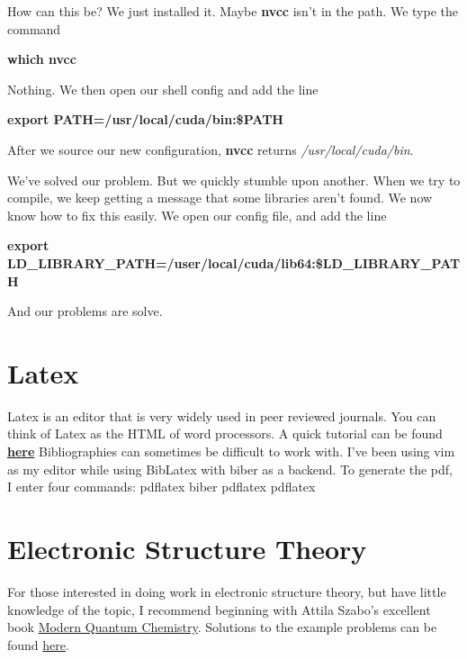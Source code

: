 \documentclass{article}
\begin{document}
\hfill

How can this be?
We just installed it.
Maybe \textbf{nvcc} isn't in the path.
We type the command  \smallskip \\

\centerline{\textbf{which nvcc}} \smallskip

\hfill

Nothing.
We then open our shell config and add the line \smallskip \\

\centerline{\textbf{export PATH=/usr/local/cuda/bin:\$PATH}} \smallskip

\hfill

After we source our new configuration, \textbf{nvcc} returns \textit{/usr/local/cuda/bin}.

\hfill

We've solved our problem.
But we quickly stumble upon another.
When we try to compile, we keep getting a message that some libraries aren't found.
We now know how to fix this easily. We open our config file, and add the line \smallskip \\

\centerline{\textbf{export LD\_LIBRARY\_PATH=/user/local/cuda/lib64:\$LD\_LIBRARY\_PATH}}

\hfill

And our problems are solve.

\section*{Latex}

Latex is an editor that is very widely used in peer reviewed journals.
You can think of Latex as the HTML of word processors.
A quick tutorial can be found \href{http://www.latex-tutorial.com/tutorials/}{\textbf{here}}
Bibliographies can sometimes be difficult to work with.
I've been using vim as my editor while using BibLatex with biber as a backend.
To generate the pdf, I enter four commands:
pdflatex
biber
pdflatex
pdflatex

\section*{Electronic Structure Theory}

For those interested in doing work in electronic structure theory, but have little knowledge of the topic,
I recommend beginning with Attila Szabo's excellent book \href{https://books.google.com/books?id=KQ3DAgAAQBAJ&pg=PA26&source=gbs_selected_pages&cad=3#v=onepage&q&f=false}{Modern Quantum Chemistry}.
Solutions to the example problems can be found \href{http://www.claudiug.com/9780486691862/}{here}.
\end{document}
